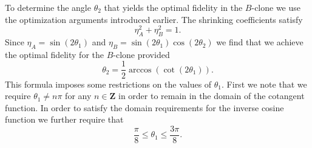 \documentclass[reqno]{amsart}
\numberwithin{lemma}{section}
\numberwithin{proposition}{section}
\newcommand{\Z}{\mathbf{Z}}
\begin{document}
To determine the angle $\theta_{2}$ that yields the optimal fidelity in the $B$-clone we use the optimization arguments introduced earlier. The shrinking coefficients satisfy
\begin{equation*}
	\eta_{A}^{2} + \eta_{B}^{2} = 1.
\end{equation*}
Since $\eta_{A} = \sin(2 \theta_{1})$ and $\eta_{B} = \sin(2\theta_{1}) \cos(2 \theta_{2})$ we find that we achieve the optimal fidelity for the $B$-clone provided
\begin{equation*}
	\theta_{2} = \frac{1}{2} \arccos(\cot(2\theta_{1})).
\end{equation*}
This formula imposes some restrictions on the values of $\theta_{1}$. First we note that we require $\theta_{1} \neq n\pi$ for any $n \in \Z$ in order to remain in the domain of the cotangent function. In order to satisfy the domain requirements for the inverse cosine function we further require that 
\begin{equation*}
	\frac{\pi}{8} \leq \theta_{1} \leq \frac{3\pi}{8}.
\end{equation*}



\end{document}
